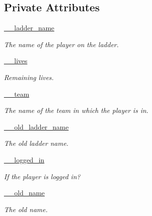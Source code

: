 \subsection*{Private Attributes}
\begin{DoxyCompactItemize}
\item 
\hyperlink{class_player_1_1_player_ab4e7b3e5188ae4bd044ffaa563098973}{\_\-\_\-ladder\_\-name}
\begin{DoxyCompactList}\small\item\em The name of the player on the ladder. \item\end{DoxyCompactList}\item 
\hyperlink{class_player_1_1_player_ade041c5e2ed4966a35e6d548746ee6da}{\_\-\_\-lives}
\begin{DoxyCompactList}\small\item\em Remaining lives. \item\end{DoxyCompactList}\item 
\hyperlink{class_player_1_1_player_ae01a2cfd1449c211cc6b6ca6d6fce853}{\_\-\_\-team}
\begin{DoxyCompactList}\small\item\em The name of the team in which the player is in. \item\end{DoxyCompactList}\item 
\hyperlink{class_player_1_1_player_a11f44d16220129d7efca52828dc13d4f}{\_\-\_\-old\_\-ladder\_\-name}
\begin{DoxyCompactList}\small\item\em The old ladder name. \item\end{DoxyCompactList}\item 
\hyperlink{class_player_1_1_player_a040c3c6e90a7655064aa65adbb4387b6}{\_\-\_\-logged\_\-in}
\begin{DoxyCompactList}\small\item\em If the player is logged in? \item\end{DoxyCompactList}\item 
\hyperlink{class_player_1_1_player_a43d105f816af7ba2c6dbe816ffaf4eba}{\_\-\_\-old\_\-name}
\begin{DoxyCompactList}\small\item\em The old name. \item\end{DoxyCompactList}\end{DoxyCompactItemize}


